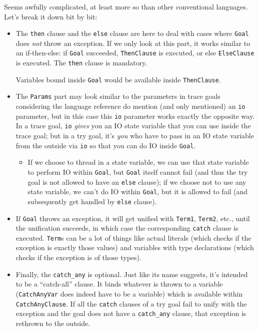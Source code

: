 Seems awfully complicated, at least more so than other conventional languages. Let's break it down bit by bit:

\begin{itemize}
\item The \texttt{then} clause and the \texttt{else} clause are here to deal with cases where \texttt{Goal} does \textit{not} throw an exception. If we only look at this part, it works similar to an if-then-else: if \texttt{Goal} succeeded, \texttt{ThenClause} is executed, or else \texttt{ElseClause} is executed. The \texttt{then} clause is mandatory.

  Variables bound inside \texttt{Goal} would be available inside \texttt{ThenClause}.
\item The \texttt{Params} part may look similar to the parameters in trace goals considering the language reference do mention (and only mentioned) an \texttt{io} parameter, but in this case this \texttt{io} parameter works exactly the opposite way. In a trace goal, \texttt{io} \textit{gives} you an IO state variable that you can use inside the trace goal; but in a try goal, it's \textit{you} who have to pass in an IO state variable from the outside via \texttt{io} so that you can do IO inside \texttt{Goal}.
  \begin{itemize}
  \item If we choose to thread in a state variable, we can use that state variable to perform IO within \texttt{Goal}, but \texttt{Goal} itself cannot fail (and thus the try goal is not allowed to have an \texttt{else} clause); if we choose not to use any state variable, we can't do IO within \texttt{Goal}, but it is allowed to fail (and subsequently get handled by \texttt{else} clause).
  \end{itemize}
  \item If \texttt{Goal} throws an exception, it will get unified with \texttt{Term1}, \texttt{Term2}, etc., until the unification succeeds, in which case the corresponding \texttt{catch} clause is executed. \texttt{Term}s can be a lot of things like actual literals (which checks if the exception is exactly those values) and variables with type declarations (which checks if the exception is of those types).
  \item Finally, the \texttt{catch_any} is optional. Just like its name suggests, it's intended to be a ``catch-all'' clause. It binds whatever is thrown to a variable (\texttt{CatchAnyVar} does indeed have to be a variable) which is available within \texttt{CatchAnyClause}. If all the \texttt{catch} clauses of a try goal fail to unify with the exception and the goal does not have a \texttt{catch_any} clause, that exception is rethrown to the outside.
\end{itemize}

